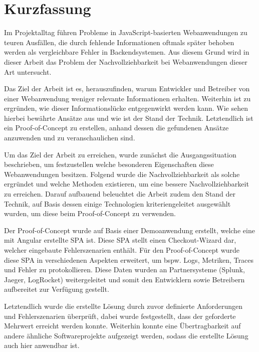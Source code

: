 \section*{\thispagestyle{empty}Kurzfassung}
	
Im Projektalltag führen Probleme in JavaScript-basierten Webanwendungen zu teuren Ausfällen, die durch fehlende Informationen oftmals später behoben werden als vergleichbare Fehler in Backendsystemen. Aus diesem Grund wird in dieser Arbeit das Problem der Nachvollziehbarkeit bei Webanwendungen dieser Art untersucht.
	
Das Ziel der Arbeit ist es, herauszufinden, warum Entwickler und Betreiber von einer Webanwendung weniger relevante Informationen erhalten. Weiterhin ist zu ergründen, wie dieser Informationslücke entgegenwirkt werden kann. Wie sehen hierbei bewährte Ansätze aus und wie ist der Stand der Technik. Letztendlich ist ein Proof-of-Concept zu erstellen, anhand dessen die gefundenen Ansätze anzuwenden und zu veranschaulichen sind.

Um das Ziel der Arbeit zu erreichen, wurde zunächst die Ausgangssituation beschrieben, um festzustellen welche besonderen Eigenschaften diese Webanwendungen besitzen. Folgend wurde die Nachvollziehbarkeit als solche ergründet und welche Methoden existieren, um eine bessere Nachvollziehbarkeit zu erreichen. Darauf aufbauend beleuchtet die Arbeit zudem den Stand der Technik, auf Basis dessen einige Technologien kriteriengeleitet ausgewählt wurden, um diese beim Proof-of-Concept zu verwenden.

Der Proof-of-Concept wurde auf Basis einer Demoanwendung erstellt, welche eine mit Angular erstellte SPA ist. Diese SPA stellt einen Checkout-Wizard dar, welcher eingebaute Fehlerszenarien enthält. Für den Proof-of-Concept wurde diese SPA in verschiedenen Aspekten erweitert, um bspw. Logs, Metriken, Traces und Fehler zu protokollieren. Diese Daten wurden an Partnersysteme (Splunk, Jaeger, LogRocket) weitergeleitet und somit den Entwicklern sowie Betreibern aufbereitet zur Verfügung gestellt.

Letztendlich wurde die erstellte Lösung durch zuvor definierte Anforderungen und Fehlerszenarien überprüft, dabei wurde festgestellt, dass der geforderte Mehrwert erreicht werden konnte. Weiterhin konnte eine Übertragbarkeit auf andere ähnliche Softwareprojekte aufgezeigt werden, sodass die erstellte Lösung auch hier anwendbar ist.

